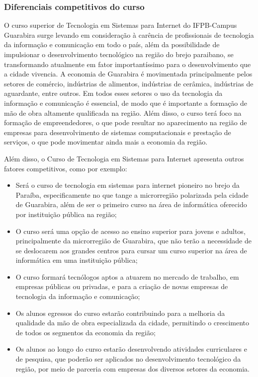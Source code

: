 \subsubsection{Diferenciais competitivos do curso}

 O curso superior de Tecnologia em Sistemas para Internet do IFPB-Campus Guarabira surge levando em consideração à carência de profissionais de tecnologia da informação e comunicação em todo o país, além da possibilidade de impulsionar o desenvolvimento tecnológico na região do brejo paraibano, se transformando atualmente em fator importantíssimo para o desenvolvimento que a cidade vivencia. A economia de Guarabira é movimentada principalmente pelos setores de comércio, indústrias de alimentos, indústrias de cerâmica, indústrias de aguardante, entre outros. Em todos esses setores o uso da tecnologia da informação e comunicação é essencial, de modo que é importante a formação de mão de obra altamente qualificada na região. Além disso, o curso terá foco na formação de empreendedores, o que pode resultar no aparecimento na região de empresas para desenvolvimento de sistemas computacionais e prestação de serviços, o que pode movimentar ainda mais a economia da região.
 
 Além disso, o Curso de Tecnologia em Sistemas para Internet apresenta outros fatores competitivos, como por exemplo: 

\begin{itemize}
	
\item Será o curso de tecnologia em sistemas para internet pioneiro no brejo da Paraíba, especificamente no que tange a microrregião polarizada pela cidade de Guarabira, além de ser o primeiro curso na área de informática oferecido por instituição pública na região;

\item O curso será uma opção de acesso ao ensino superior para jovens e adultos, principalmente da microrregião de Guarabira, que não terão a necessidade de se deslocarem aos grandes centros para cursar um curso superior na área de informática em uma instituição pública;

\item O curso formará tecnólogos aptos a atuarem no mercado de trabalho, em empresas públicas ou privadas, e para a criação de novas empresas de tecnologia da informação e comunicação; 

\item Os alunos egressos do curso estarão contribuindo para a melhoria da qualidade da mão de obra especializada da cidade, permitindo o crescimento de todos os segmentos da economia da região;

\item Os alunos ao longo do curso estarão desenvolvendo atividades curriculares e de pesquisa, que poderão ser aplicados no desenvolvimento tecnológico da região, por meio de parceria com empresas dos diversos setores da economia.

\end{itemize}


